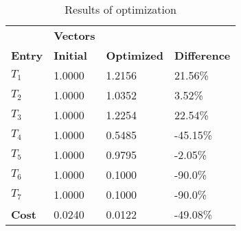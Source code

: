 \begin{table}[H]
\centering
\begin{tabular}{llll}
\textbf{}      & \cellcolor[HTML]{EFEFEF}\textbf{Vectors} & \textbf{} & \textbf{}         \\
\rowcolor[HTML]{EFEFEF} 
\textbf{Entry} & \textbf{Initial} & \textbf{Optimized} & \textbf{Difference} \\
$T_1$ & 1.0000 & 1.2156 & 21.56\% \\ 
$T_2$ & 1.0000 & 1.0352 & 3.52\% \\ 
$T_3$ & 1.0000 & 1.2254 & 22.54\% \\ 
$T_4$ & 1.0000 & 0.5485 & -45.15\% \\ 
$T_5$ & 1.0000 & 0.9795 & -2.05\% \\ 
$T_6$ & 1.0000 & 0.1000 & -90.0\% \\ 
$T_7$ & 1.0000 & 0.1000 & -90.0\% \\ 
\rowcolor[HTML]{EFEFEF} 
\textbf{Cost}  & 0.0240 & 0.0122 & -49.08\% \\ 
\end{tabular}
\caption{Results of optimization}
\label{tab:OptimizationAnalysis}
\end{table}